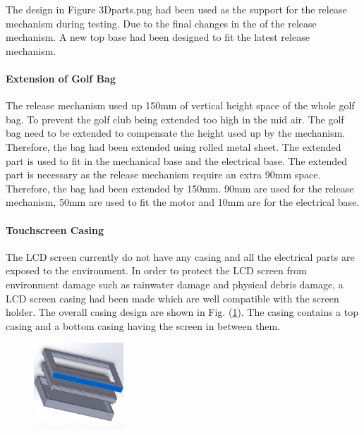 \documentclass[11pt,landscape]{article}
\begin{document}
\begin{multicols}{3}
The design in Figure 3Dparts.png had been used as the support for the release
mechanism during testing. Due to the final changes in the of the release
mechanism. A new top base had been designed to fit the latest release mechanism. 

\paragraph{Extension of Golf Bag}
The release mechanism used up 150mm of vertical height space of the whole golf
bag. To prevent the golf club being extended too high in the mid air. The golf
bag need to be extended to compensate the height used up by the mechanism.
Therefore, the bag had been extended using rolled metal sheet. The extended
part is used to fit in the mechanical base and the electrical base. The extended
part is necessary as the release mechanism require an extra 90mm space.
Therefore, the bag had been extended by 150mm. 90mm are used for the release
mechanism, 50mm are used to fit the motor and 10mm are for the electrical base. 

\paragraph{Touchscreen Casing}
The LCD screen currently do not have any casing and all the electrical parts are
exposed to the environment. In order to protect the LCD screen from environment
damage such as rainwater damage and physical debris damage, a LCD screen casing
had been made which are well compatible with the screen holder. The overall
casing design are shown in Fig. (\ref{fig:screen_casing}). The casing contains a top casing
and a bottom casing having the screen in between them.

\begin{figure}[H]
    \begin{center}
        \includegraphics[width=0.3\textwidth]{casing.png}
        \label{fig:screen_casing}
    \end{center}
\end{figure}


\end{multicols}
\end{document}
